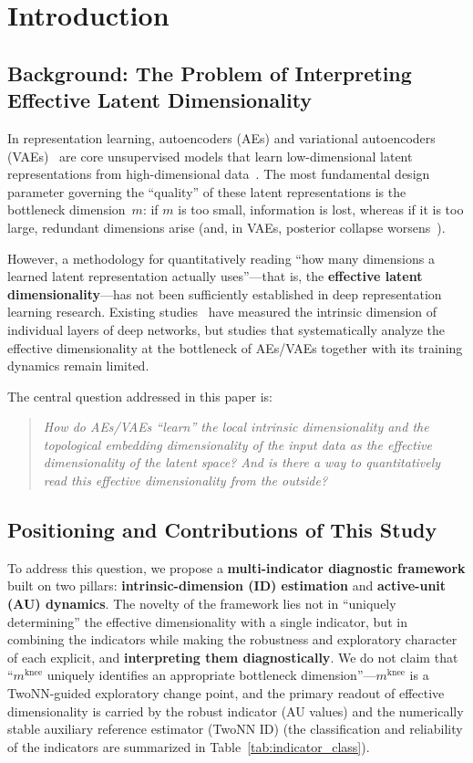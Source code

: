 \documentclass[make,article,submit,pdftex,moreauthors]{Definitions/mdpi}
\newcommand{\mknee}{m^{\mathrm{knee}}}
\begin{document}
\section{Introduction}\label{sec:intro}

\subsection{Background: The Problem of Interpreting Effective Latent Dimensionality}\label{sec:intro_bg}

In representation learning, autoencoders (AEs) and
variational autoencoders (VAEs)~\cite{kingma2014vae} are
core unsupervised models that learn low-dimensional latent representations
from high-dimensional data~\cite{bengio2013representation}.
The most fundamental design parameter governing the ``quality'' of these
latent representations is the bottleneck dimension~$m$:
if $m$ is too small, information is lost, whereas if it is too large,
redundant dimensions arise (and, in VAEs, posterior collapse
worsens~\cite{lucas2019elbo}).

However, a methodology for quantitatively reading ``how many dimensions a
learned latent representation actually uses''---that is, the
\textbf{effective latent dimensionality}---has not been sufficiently
established in deep representation learning research.
Existing studies~\cite{ansuini2019intrinsic,valeriani2023geometry} have
measured the intrinsic dimension of individual layers of deep networks,
but studies that systematically analyze the effective dimensionality at the
bottleneck of AEs/VAEs together with its training dynamics remain limited.

The central question addressed in this paper is:
\begin{quote}
\textit{How do AEs/VAEs ``learn'' the local intrinsic dimensionality and the
topological embedding dimensionality of the input data as the effective
dimensionality of the latent space?
And is there a way to quantitatively read this effective dimensionality
from the outside?}
\end{quote}

\subsection{Positioning and Contributions of This Study}\label{sec:intro_aim}

To address this question, we propose a
\textbf{multi-indicator diagnostic framework} built on two pillars:
\textbf{intrinsic-dimension (ID) estimation} and \textbf{active-unit (AU) dynamics}.
The novelty of the framework lies not in ``uniquely determining'' the
effective dimensionality with a single indicator, but in combining the
indicators while making the robustness and exploratory character of each
explicit, and \textbf{interpreting them diagnostically}.
We do not claim that ``$\mknee$ uniquely identifies an appropriate
bottleneck dimension''---$\mknee$ is a TwoNN-guided exploratory change
point, and the primary readout of effective dimensionality is carried by the
robust indicator (AU values) and the numerically stable auxiliary
reference estimator (TwoNN ID)
(the classification and reliability of the indicators are summarized in
Table~\ref{tab:indicator_class}).
\end{document}
